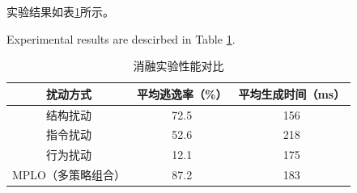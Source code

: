 实验结果如表\ref{tab:5.11}所示。

Experimental results are descirbed in Table \ref{tab:5.11}.

\begin{table}[htbp]
	\centering
	\caption{消融实验性能对比}
	\label{tab:5.11}
	\begin{tabular*}{0.9\textwidth}{@{\extracolsep{\fill}}ccc}
		\toprule
		扰动方式 & 平均逃逸率（\%） & 平均生成时间（ms） \\
		\midrule
		结构扰动 & 72.5 & 156 \\
		指令扰动 & 52.6 & 218 \\
		行为扰动 & 12.1 & 175 \\
		MPLO（多策略组合） & 87.2 & 183 \\
		\bottomrule
	\end{tabular*}
\end{table}





